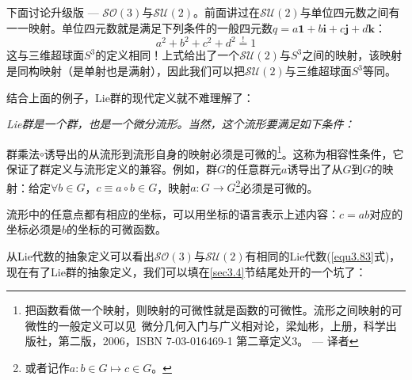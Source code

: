 下面讨论升级版 --- $\mathcal{SO}(3)$与$\mathcal{SU}(2)$。前面讲过在$\mathcal{SU}(2)$与单位四元数之间有一一映射。单位四元数就是满足下列条件的一般四元数$q = a\mathbf{1} + b\mathbf{i} +c\mathbf{j} + d\mathbf{k}$：
\begin{equation}
\label{equ3.85}
a^2 + b^2 + c^2 + d^2 \stackrel{!}{=} 1
\end{equation}
这与三维超球面$S^3$的定义相同！上式给出了一个$\mathcal{SU}(2)$与$S^3$之间的映射，该映射是同构映射（是单射也是满射），因此我们可以把$\mathcal{SU}(2)$与三维超球面$S^3$等同。

结合上面的例子，Lie群的现代定义就不难理解了：

{\it
Lie群是一个群，也是一个微分流形。当然，这个流形要满足如下条件：

群乘法$\circ$诱导出的从流形到流形自身的映射必须是可微的\footnote{把函数看做一个映射，则映射的可微性就是函数的可微性。流形之间映射的可微性的一般定义可以见\, 微分几何入门与广义相对论，梁灿彬，上册，科学出版社，第二版，2006，ISBN 7-03-016469-1 第二章定义3。 --- 译者}。这称为相容性条件，它保证了群定义与流形定义的兼容。例如，群$G$的任意群元$a$诱导出了从$G$到$G$的映射：给定$\forall b \in G$，$c \equiv a \circ b \in G$，映射$a: G \rightarrow G$\footnote{或者记作$a: b \in G \mapsto c \in G$。}必须是可微的。

流形中的任意点都有相应的坐标，可以用坐标的语言表示上述内容：$c = ab$对应的坐标必须是$b$的坐标的可微函数。
}

从Lie代数的抽象定义可以看出$\mathcal{SO}(3)$与$\mathcal{SU}(2)$有相同的Lie代数(\eqref{equ3.83}式)，现在有了Lie群的抽象定义，我们可以填在\ref{sec3.4}节结尾处开的一个坑了：

